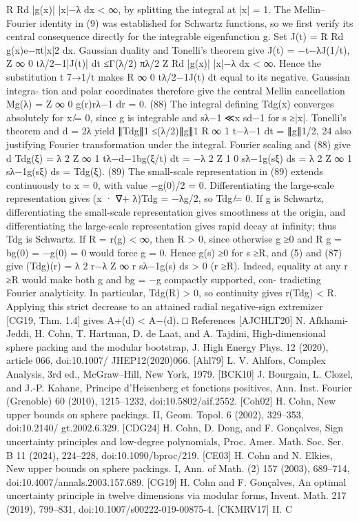 R
Rd |g(x)| |x|−λ dx < ∞, by splitting the integral at |x| = 1. The Mellin–Fourier identity in (9)
was established for Schwartz functions, so we ﬁrst verify its central consequence directly for
the integrable eigenfunction g. Set J(t) =
R
Rd g(x)e−πt|x|2 dx. Gaussian duality and Tonelli’s
theorem give
J(t) = −t−λJ(1/t),
Z ∞
0
tλ/2−1|J(t)| dt ≤Γ(λ/2)
πλ/2
Z
Rd |g(x)| |x|−λ dx < ∞.
Hence the substitution t 7→1/t makes
R ∞
0 tλ/2−1J(t) dt equal to its negative. Gaussian integra-
tion and polar coordinates therefore give the central Mellin cancellation
Mg(λ) =
Z ∞
0
g(r)rλ−1 dr = 0.
(88)
The integral deﬁning Tdg(x) converges absolutely for x ̸= 0, since g is integrable and sλ−1 ≪x
sd−1 for s ≥|x|. Tonelli’s theorem and d = 2λ yield ∥Tdg∥1 ≤(λ/2)∥g∥1
R ∞
1 t−λ−1 dt = ∥g∥1/2,
24
also justifying Fourier transformation under the integral. Fourier scaling and (88) give
d
Tdg(ξ) = λ
2
Z ∞
1
tλ−d−1bg(ξ/t) dt
= −λ
2
Z 1
0
sλ−1g(sξ) ds
= λ
2
Z ∞
1
sλ−1g(sξ) ds = Tdg(ξ).
(89)
The small-scale representation in (89) extends continuously to x = 0, with value −g(0)/2 = 0.
Diﬀerentiating the large-scale representation gives (x · ∇+ λ)Tdg = −λg/2, so Tdg ̸= 0. If g
is Schwartz, diﬀerentiating the small-scale representation gives smoothness at the origin, and
diﬀerentiating the large-scale representation gives rapid decay at inﬁnity; thus Tdg is Schwartz.
If R = r(g) < ∞, then R > 0, since otherwise g ≥0 and
R g = bg(0) = −g(0) = 0 would force
g = 0. Hence g(s) ≥0 for s ≥R, and (5) and (87) give
(Tdg)(r) = λ
2 r−λ
Z ∞
r
sλ−1g(s) ds > 0
(r ≥R).
Indeed, equality at any r ≥R would make both g and bg = −g compactly supported, con-
tradicting Fourier analyticity.
In particular, Tdg(R) > 0, so continuity gives r(Tdg) < R.
Applying this strict decrease to an attained radial negative-sign extremizer [CG19, Thm. 1.4]
gives A+(d) < A−(d).
□
References
[AJCHLT20] N. Afkhami-Jeddi, H. Cohn, T. Hartman, D. de Laat, and A. Tajdini, High-dimensional sphere
packing and the modular bootstrap, J. High Energy Phys. 12 (2020), article 066, doi:10.1007/
JHEP12(2020)066.
[Ahl79]
L. V. Ahlfors, Complex Analysis, 3rd ed., McGraw–Hill, New York, 1979.
[BCK10]
J. Bourgain, L. Clozel, and J.-P. Kahane, Principe d’Heisenberg et fonctions positives, Ann. Inst.
Fourier (Grenoble) 60 (2010), 1215–1232, doi:10.5802/aif.2552.
[Coh02]
H. Cohn, New upper bounds on sphere packings. II, Geom. Topol. 6 (2002), 329–353, doi:10.2140/
gt.2002.6.329.
[CDG24]
H. Cohn, D. Dong, and F. Gonçalves, Sign uncertainty principles and low-degree polynomials, Proc.
Amer. Math. Soc. Ser. B 11 (2024), 224–228, doi:10.1090/bproc/219.
[CE03]
H. Cohn and N. Elkies, New upper bounds on sphere packings. I, Ann. of Math. (2) 157 (2003),
689–714, doi:10.4007/annals.2003.157.689.
[CG19]
H. Cohn and F. Gonçalves, An optimal uncertainty principle in twelve dimensions via modular
forms, Invent. Math. 217 (2019), 799–831, doi:10.1007/s00222-019-00875-4.
[CKMRV17] H. C

